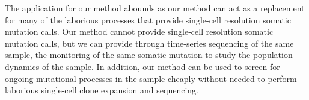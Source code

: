 The application for our method abounds as our method can act as a replacement for many of the laborious processes that provide single-cell resolution somatic mutation calls. Our method cannot provide single-cell resolution somatic mutation calls, but we can provide through time-series sequencing of the same sample, the monitoring of the same somatic mutation to study the population dynamics of the sample. In addition, our method can be used to screen for ongoing mutational processes in the sample cheaply without needed to perform laborious single-cell clone expansion and sequencing. 
 















